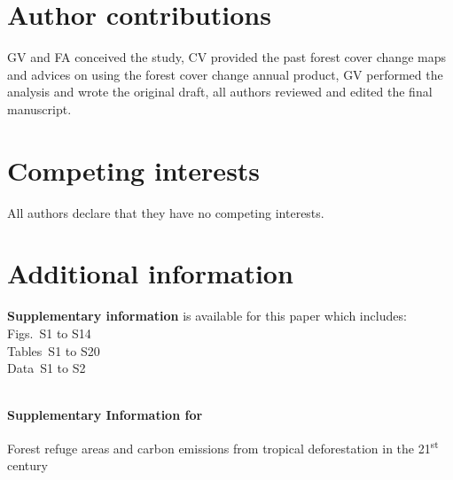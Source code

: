 \documentclass[
  12pt,
]{article}
\begin{document}
\section{Author contributions}

GV and FA conceived the study, CV provided the past forest cover change maps and advices on using the forest cover change annual product, GV performed the analysis and wrote the original draft, all authors reviewed and edited the final manuscript.

\section{Competing interests}

All authors declare that they have no competing interests.

\section{Additional information}

\textbf{Supplementary information} is available for this paper which includes:\\

\noindent Figs.~S1 to S14\\
Tables~S1 to S20\\
Data~S1 to S2\\


\nolinenumbers
\newpage

\renewcommand{\thetable}{S\arabic{table}}
\renewcommand{\thefigure}{S\arabic{figure}}
\renewcommand{\theequation}{S\arabic{equation}}
\setcounter{figure}{0}
\setcounter{table}{0}

\begin{center}
  ~\\%
  \vspace{0.5cm}
  \Large{\textbf{Supplementary Information for}}
\end{center}

\vspace{1cm}

\begin{center}
  \LARGE{Forest refuge areas and carbon emissions from tropical deforestation in the 21\textsuperscript{st} century}
\end{center}
\end{document}
